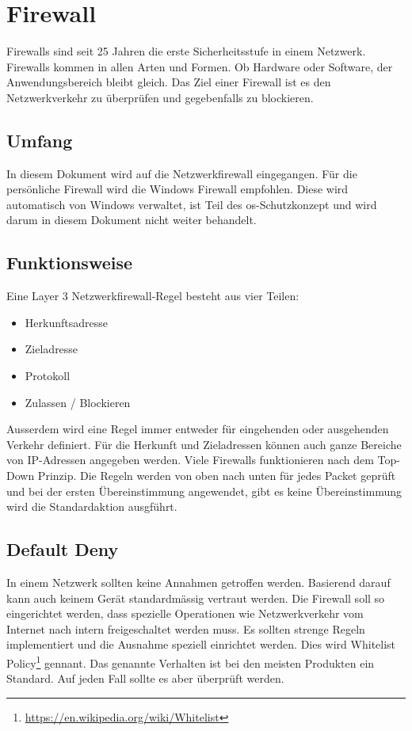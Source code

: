 \chapter{Firewall}
Firewalls sind seit 25 Jahren die erste Sicherheitsstufe in einem Netzwerk.
Firewalls kommen in allen Arten und Formen.
Ob Hardware oder Software, der Anwendungsbereich bleibt gleich.
Das Ziel einer Firewall ist es den Netzwerkverkehr zu überprüfen und gegebenfalls zu blockieren.


\section{Umfang}
In diesem Dokument wird auf die Netzwerkfirewall eingegangen.
Für die persönliche Firewall wird die Windows Firewall empfohlen.
Diese wird automatisch von Windows verwaltet, ist Teil des \acrshort{os}-Schutzkonzept und wird darum in diesem Dokument nicht weiter behandelt.

\section{Funktionsweise}
Eine Layer 3 Netzwerkfirewall-Regel besteht aus vier Teilen:
\begin{itemize}
    \item Herkunftsadresse
    \item Zieladresse
    \item Protokoll
    \item Zulassen / Blockieren
\end{itemize}

Ausserdem wird eine Regel immer entweder für eingehenden oder ausgehenden Verkehr definiert.
Für die Herkunft und Zieladressen können auch ganze Bereiche von IP-Adressen angegeben werden.
Viele Firewalls funktionieren nach dem Top-Down Prinzip. 
Die Regeln werden von oben nach unten für jedes Packet geprüft und bei der ersten Übereinstimmung angewendet, gibt es keine Übereinstimmung wird die Standardaktion ausgführt.

\section{Default Deny}
In einem Netzwerk sollten keine Annahmen getroffen werden.
Basierend darauf kann auch keinem Gerät standardmässig vertraut werden.
Die Firewall soll so eingerichtet werden, dass spezielle Operationen wie Netzwerkverkehr vom Internet nach intern freigeschaltet werden muss.
Es sollten strenge Regeln implementiert und die Ausnahme speziell einrichtet werden.
Dies wird Whitelist Policy\footnote{\href{https://en.wikipedia.org/wiki/Whitelist}{https://en.wikipedia.org/wiki/Whitelist}} gennant.
Das genannte Verhalten ist bei den meisten Produkten ein Standard.
Auf jeden Fall sollte es aber überprüft werden.\\

